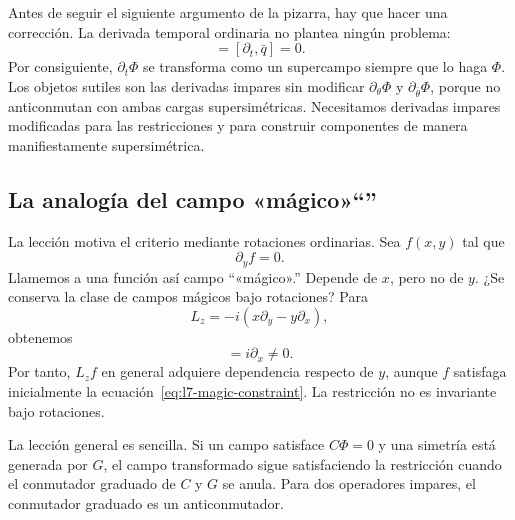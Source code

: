 Antes de seguir el siguiente argumento de la pizarra, hay que hacer una corrección. La derivada temporal ordinaria no plantea ningún problema:
\begin{equation}
[\partial_t,q]=[\partial_t,\bar q]=0.
\end{equation}
Por consiguiente, \(\partial_t\Phi\) se transforma como un supercampo siempre que lo haga \(\Phi\). Los objetos sutiles son las derivadas impares sin modificar \(\partial_\theta\Phi\) y \(\partial_{\bar\theta}\Phi\), porque no anticonmutan con ambas cargas supersimétricas. Necesitamos derivadas impares modificadas para las restricciones y para construir componentes de manera manifiestamente supersimétrica.

\subsection{La analogía del campo «mágico»``''}

La lección motiva el criterio mediante rotaciones ordinarias. Sea \(f(x,y)\) tal que
\begin{equation}
\partial_y f=0.
\label{eq:l7-magic-constraint}
\end{equation}
Llamemos a una función así campo ``«mágico».'' Depende de \(x\), pero no de \(y\). ¿Se conserva la clase de campos mágicos bajo rotaciones? Para
\begin{equation}
L_z=-i\left(x\partial_y-y\partial_x\right),
\end{equation}
obtenemos
\begin{equation}
[\partial_y,L_z]=i\partial_x\neq0.
\end{equation}
Por tanto, \(L_z f\) en general adquiere dependencia respecto de \(y\), aunque \(f\) satisfaga inicialmente la ecuación~\eqref{eq:l7-magic-constraint}. La restricción no es invariante bajo rotaciones.

La lección general es sencilla. Si un campo satisface \(C\Phi=0\) y una simetría está generada por \(G\), el campo transformado sigue satisfaciendo la restricción cuando el conmutador graduado de \(C\) y \(G\) se anula. Para dos operadores impares, el conmutador graduado es un anticonmutador.

